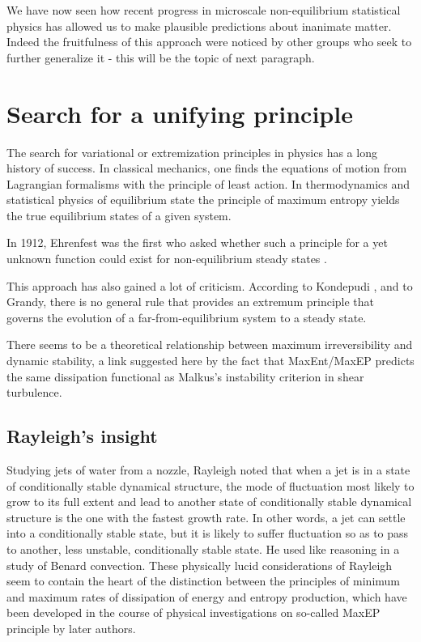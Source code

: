 \documentclass[a4paper,12pt]{article}
\begin{document}
We have now seen how recent progress in microscale non-equilibrium statistical physics has allowed us to make plausible predictions about inanimate matter. Indeed the fruitfulness of this approach were noticed by other groups who seek to further generalize it - this will be the topic of next paragraph.

\section{Search for a unifying principle}
\label{UnifyingPrinciple}
The search for variational or extremization principles in physics has a long history of success. In classical mechanics, one finds the equations of motion from Lagrangian formalisms with the principle of least action. In thermodynamics and statistical physics of equilibrium state the principle of maximum entropy yields the true equilibrium states of a given system. 

In 1912, Ehrenfest was the first who asked whether such a principle for a yet unknown function could exist for non-equilibrium steady states \cite{Dewar:2014ek}.

This approach has also gained a lot of criticism.
According to Kondepudi \cite{Kondepudi:1141550}, and to Grandy\cite{Grandy:1135724}, there is no general rule that provides an extremum principle that governs the evolution of a far-from-equilibrium system to a steady state. 

There seems to be a theoretical relationship between maximum irreversibility and dynamic stability, a link suggested here by the fact that MaxEnt/MaxEP predicts the same dissipation functional as Malkus's instability criterion in shear turbulence\cite{Dewar:2014ek}.

\subsection{Rayleigh's insight}
Studying jets of water from a nozzle, Rayleigh \cite{Rayleigh:1878hb} noted that when a jet is in a state of conditionally stable dynamical structure, the mode of fluctuation most likely to grow to its full extent and lead to another state of conditionally stable dynamical structure is the one with the fastest growth rate. In other words, a jet can settle into a conditionally stable state, but it is likely to suffer fluctuation so as to pass to another, less unstable, conditionally stable state. He used like reasoning in a study of Benard convection\cite{Rayleigh:1916fa}. These physically lucid considerations of Rayleigh seem to contain the heart of the distinction between the principles of minimum and maximum rates of dissipation of energy and entropy production, which have been developed in the course of physical investigations on so-called MaxEP principle by later authors.
\end{document}
